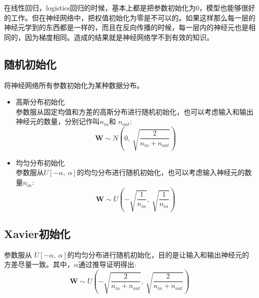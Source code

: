 \documentclass[UTF-8]{progbookcn}
\begin{document}
在线性回归，logistics回归的时候，基本上都是把参数初始化为0，模型也能够很好的工作。但在神经网络中，把权值初始化为零是不可以的。如果这样那么每一层的神经元学到的东西都是一样的，而且在反向传播的时候，每一层内的神经元也是相同的，因为梯度相同。造成的结果就是神经网络学不到有效的知识。

\subsection{随机初始化}
\begin{keypoint}
将神经网络所有参数初始化为某种数据分布\cite{DBLP:journals/mp/ChenCFM19}。
\end{keypoint}

\begin{itemize}
  \item 高斯分布初始化\\
  参数服从固定均值和方差的高斯分布进行随机初始化，也可以考虑输入和输出神经元的数量，分别记作叫$n_{in}$和 $n_{out}$:
  \begin{equation}%
    \bm{W} \sim N(0, ~\sqrt{\frac{2}{n_{in}+n_{out}}})
  \end{equation}
  \item 均匀分布初始化\\
  参数服从$U[-\alpha, ~\alpha]$的均匀分布进行随机初始化，也可以考虑输入神经元的数量$n_{in}$:
  \begin{equation}%
    \bm{W} \sim U(-\sqrt{\frac{1}{n_{in}}},~ \sqrt{\frac{1}{n_{in}}})
  \end{equation}
\end{itemize}




\subsection{Xavier初始化}
参数服从 $U[-\alpha, ~\alpha]$的均匀分布进行随机初始化，目的是让输入和输出神经元的方差尽量一致\cite{pmlr-v9-glorot10a}。其中，$\alpha$通过推导证明得出:
\begin{equation}\label{Eq:Xavier}
    \bm{W} \sim U(-\sqrt{\frac{2}{n_{in}+n_{out}}},~ \sqrt{\frac{2}{n_{in}+n_{out}}})
  \end{equation}
\end{document}
